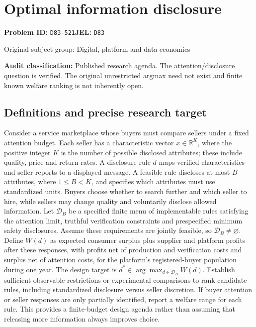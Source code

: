 \documentclass[11pt,a4paper]{article}
\begin{document}
\section*{Optimal information disclosure}
\textbf{Problem ID:} \texttt{D83-521}\quad \textbf{JEL:} \texttt{D83}\par
\label{problem:OP-0402}
{\sffamily\small\color{muted}Original subject group: Digital, platform and data economics\par}
\label{definitions:problem:30007684}
\textbf{Audit classification:} Published research agenda. The attention/disclosure question is verified. The original unrestricted argmax need not exist and finite known welfare ranking is not inherently open.
\subsection*{Definitions and precise research target}
Consider a service marketplace whose buyers must compare sellers under a fixed attention budget. Each seller has a characteristic vector \(x\in\mathbb R^K\), where the positive integer \(K\) is the number of possible disclosed attributes; these include quality, price and return rates. A disclosure rule \(d\) maps verified characteristics and seller reports to a displayed message. A feasible rule discloses at most \(B\) attributes, where \(1\leq B<K\), and specifies which attributes must use standardized units. Buyers choose whether to search further and which seller to hire, while sellers may change quality and voluntarily disclose allowed information. Let \(\mathcal D_B\) be a specified finite menu of implementable rules satisfying the attention limit, truthful verification constraints and prespecified minimum safety disclosures. Assume these requirements are jointly feasible, so \(\mathcal D_B\neq\varnothing\). Define \(W(d)\) as expected consumer surplus plus supplier and platform profits after these responses, with profits net of production and verification costs and surplus net of attention costs, for the platform's registered-buyer population during one year. The design target is \(d^*\in\arg\max_{d\in\mathcal D_B}W(d)\). Establish sufficient observable restrictions or experimental comparisons to rank candidate rules, including standardized disclosure versus seller discretion. If buyer attention or seller responses are only partially identified, report a welfare range for each rule. This provides a finite-budget design agenda rather than assuming that releasing more information always improves choice.
\end{document}
